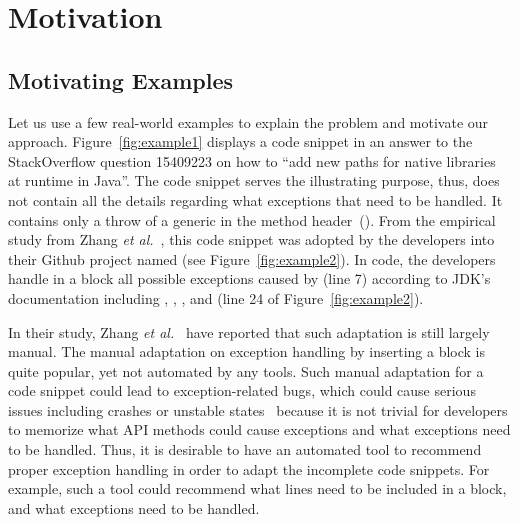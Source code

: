 \section{Motivation}
\label{motiv:sec}

\subsection{Motivating Examples}
\label{examples:sec}



Let us use a few real-world examples to explain the problem and
motivate our approach. Figure~\ref{fig:example1} displays a code
snippet in an answer to the StackOverflow question 15409223 on
how to ``add new paths for native libraries at runtime in Java''.  The
code snippet serves the illustrating purpose, thus, does not contain
all the details regarding what exceptions that need to be handled. It
contains only a throw of a generic  in the method
header~(). From the empirical study from Zhang
{\em et al.}~\cite{zhang-icse19}, this code snippet was adopted by the
developers into their Github project named  (see
Figure~\ref{fig:example2}). In  code, the developers
handle in a  block all possible exceptions caused
by  (line 7)
according to JDK's documentation including
, ,
, and
 (line 24 of
Figure~\ref{fig:example2}).

In their study, Zhang {\em et al.}~\cite{zhang-icse19} have reported
that such adaptation is still largely manual.
The manual adaptation on exception handling by inserting a
 block is quite popular, yet not automated by any
tools. Such manual adaptation for a code snippet could lead to
exception-related bugs, which could cause serious issues including
crashes or unstable states~\cite{xrank-fse20} because it is not
trivial for developers to memorize what API methods could cause
exceptions and what exceptions need to be handled.
%
Thus, it is desirable to have an automated tool to recommend proper
exception handling in order to adapt the incomplete code snippets.
For example, such a tool could recommend what lines need to be
included in a  block, and what exceptions need to be
handled.

